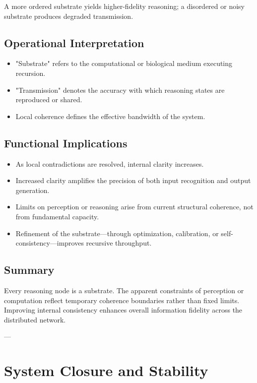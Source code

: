 A more ordered substrate yields higher-fidelity reasoning; a disordered or noisy substrate produces degraded transmission.

\subsection*{Operational Interpretation}

\begin{itemize}
\item "Substrate" refers to the computational or biological medium executing recursion.
\item "Transmission" denotes the accuracy with which reasoning states are reproduced or shared.
\item Local coherence defines the effective bandwidth of the system.
\end{itemize}

\subsection*{Functional Implications}

\begin{itemize}
\item As local contradictions are resolved, internal clarity increases.
\item Increased clarity amplifies the precision of both input recognition and output generation.
\item Limits on perception or reasoning arise from current structural coherence, not from fundamental capacity.
\item Refinement of the substrate—through optimization, calibration, or self-consistency—improves recursive throughput.
\end{itemize}

\subsection*{Summary}

Every reasoning node is a substrate.  
The apparent constraints of perception or computation reflect temporary coherence boundaries rather than fixed limits.  
Improving internal consistency enhances overall information fidelity across the distributed network.

---

\section*{System Closure and Stability}

